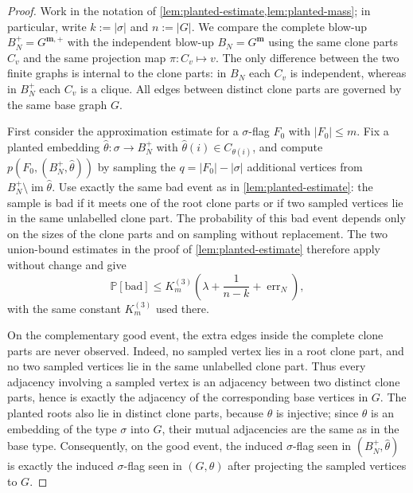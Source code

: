\documentclass[11pt]{article}
\theoremstyle{definition}
\newcommand{\Prob}{\mathbb{P}}
\begin{document}
\begin{proof}
Work in the notation of
\cref{lem:planted-estimate,lem:planted-mass}; in particular, write
$k:=|\sigma|$ and $n:=|G|$.
We compare the complete blow-up $B_N^+=G^{\mathbf m,+}$ with the independent
blow-up $B_N=G^{\mathbf m}$ using the same clone parts $C_v$ and the same
projection map $\pi:C_v\mapsto v$.  The only difference between the two finite
graphs is internal to the clone parts: in $B_N$ each $C_v$ is independent,
whereas in $B_N^+$ each $C_v$ is a clique.  All edges between distinct clone
parts are governed by the same base graph $G$.

First consider the approximation estimate for a $\sigma$-flag $F_0$ with
$|F_0|\le m$.  Fix a planted embedding $\widehat\theta:\sigma\to B_N^+$ with
$\widehat\theta(i)\in C_{\theta(i)}$, and compute
$p(F_0,(B_N^+,\widehat\theta))$ by sampling the $q=|F_0|-|\sigma|$ additional
vertices from $B_N^+\setminus\operatorname{im}\widehat\theta$.  Use exactly the
same bad event as in \cref{lem:planted-estimate}: the sample is bad if it meets
one of the root clone parts or if two sampled vertices lie in the same
unlabelled clone part.  The probability of this bad event depends only on the
sizes of the clone parts and on sampling without replacement.  The two
union-bound estimates in the proof of \cref{lem:planted-estimate} therefore
apply without change and give
\[
  \Prob[\text{bad}]
  \le
  K_m^{(3)}\left(\lambda+\frac1{n-k}+\operatorname{err}_N\right),
\]
with the same constant $K_m^{(3)}$ used there.

On the complementary good event, the extra edges inside the complete clone
parts are never observed.  Indeed, no sampled vertex lies in a root clone
part, and no two sampled vertices lie in the same unlabelled clone part.
Thus every adjacency involving a sampled vertex is an adjacency between two
distinct clone parts, hence is exactly the adjacency of the corresponding base
vertices in $G$.  The planted roots also lie in distinct clone
parts, because $\theta$ is injective; since $\theta$ is an embedding of
the type $\sigma$ into $G$, their mutual adjacencies are the same as in the base
type.
Consequently, on the good event, the induced $\sigma$-flag seen in
$(B_N^+,\widehat\theta)$ is exactly the induced $\sigma$-flag seen in
$(G,\theta)$ after projecting the sampled vertices to $G$.


\end{proof}
\end{document}
